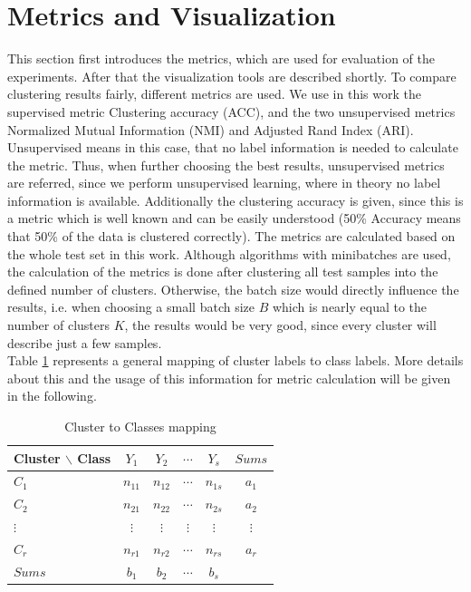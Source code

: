 \documentclass[12pt,DIV14,BCOR12mm,a4paper,footexclude,headinclude,halfparskip-,twoside,openright,openany,cleardoubleempty,idxtotoc,bibtotoc]{scrreprt} %
\numberwithin{equation}{chapter}
\begin{document}
\section{Metrics and Visualization}
This section first introduces the metrics, which are used for evaluation of the experiments. After that the visualization tools are described shortly. To compare clustering results fairly, different metrics are used. We use in this work the supervised metric Clustering accuracy (ACC), and the two unsupervised metrics Normalized Mutual Information (NMI) and Adjusted Rand Index (ARI). Unsupervised means in this case, that no label information is needed to calculate the metric. Thus, when further choosing the best results, unsupervised metrics are referred, since we perform unsupervised learning, where in theory no label information is available. Additionally the clustering accuracy is given, since this is a metric which is well known and can be easily understood (50\% Accuracy means that 50\% of the data is clustered correctly). The metrics are calculated based on the whole test set in this work. Although algorithms with minibatches are used, the calculation of the metrics is done after clustering all test samples into the defined number of clusters. Otherwise, the batch size would directly influence the results, i.e. when choosing a small batch size $B$ which is nearly equal to the number of clusters $K$, the results would be very good, since every cluster will describe just a few samples.\\
Table \ref{tab:ClusterClassesmapping} represents a general mapping of cluster labels to class labels. More details about this and the usage of this information for metric calculation will be given in the following.
	\begin{table}[htb!]
    		\centering
    		\caption{Cluster to Classes mapping}
    		\label{tab:ClusterClassesmapping}
    		\begin{tabular}{l|cccc|c}
        		Cluster $\backslash$ Class & $Y_1$ & $Y_2$ & $\cdots$ & $Y_s$ & $Sums$\\ \hline
        		$C_1$ & $n_{11}$ & $n_{12}$ & $\cdots$ & $n_{1s}$ & $a_1$\\
        		$C_2$ & $n_{21}$ & $n_{22}$ & $\cdots$ & $n_{2s}$ & $a_2$\\
        		$\vdots$ & $\vdots$ & $\vdots$ & $\vdots$ & $\vdots$ & $\vdots$\\
        		$C_r$ & $n_{r1}$ & $n_{r2}$ & $\cdots$ & $n_{rs}$ & $a_r$\\ \hline
        		$Sums$ & $b_1$ & $b_2$ & $\cdots$ & $b_s$ & \\
    		\end{tabular}
	\end{table}
\end{document}
